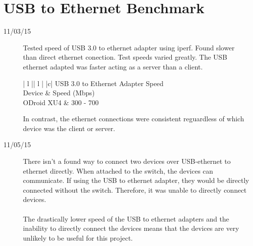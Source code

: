 \section{USB to Ethernet Benchmark}
\begin{description}
\item [11/03/15] Tested speed of USB 3.0 to ethernet adapter using iperf. Found slower than direct ethernet conection. Test speeds varied greatly. The USB ethernet adapted was faster acting as a server than a client.

\begin{center}
\begin{tabular}{ | l || l | }
\hline
{}
{ |c| }{ USB 3.0 to Ethernet Adapter Speed } \\
\hline
Device & Speed (Mbps) \\
\hline
ODroid XU4 & 300 - 700 \\
\hline
\end{tabular}
\end{center}

In contrast, the ethernet connections were consistent reguardless of which device was the client or server.

\item [11/05/15] There isn't a found way to connect two devices over USB-ethernet to ethernet directly. When attached to the switch, the devices can communicate. If using the USB to ethernet adapter, they would be directly connected without the switch. Therefore, it was unable to directly connect devices. \\ \\
The drastically lower speed of the USB to ethernet adapters and the inability to directly connect the devices means that the devices are very unlikely to be useful for this project.
\end{description}

